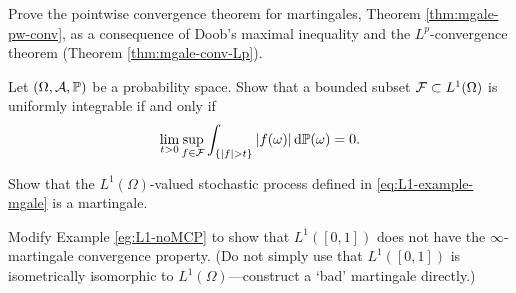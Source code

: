 \begin{exercise}\label{ex:mgale-conv}
  Prove the pointwise convergence theorem for martingales, Theorem \ref{thm:mgale-pw-conv}, as a consequence of Doob's maximal inequality and the $L^p$-convergence theorem (Theorem \ref{thm:mgale-conv-Lp}).
\end{exercise}

\begin{exercise}\label{ex:UI-characterisation}
  Let $(\Omega,\mathcal{A},\mathbb{P})$ be a probability space.
  Show that a bounded subset $\mathcal{F} \subset L^1(\Omega)$ is uniformly integrable if and only if
  \begin{equation*}
    \lim_{t > 0} \sup_{f \in \mathcal{F}} \int_{\{|f| > t\}} |f(\omega)| \, \mathrm{d}\mathbb{P}(\omega) = 0.
  \end{equation*}
\end{exercise}

\begin{exercise}\label{ex:mgale-check}
  Show that the $L^1(\Omega)$-valued stochastic process defined in \eqref{eq:L1-example-mgale} is a martingale. 
\end{exercise}

\begin{exercise}\label{ex:L1-noMCP-var}
  Modify Example \ref{eg:L1-noMCP} to show that $L^1([0,1])$ does not have the $\infty$-martingale convergence property. (Do not simply use that $L^1([0,1])$ is isometrically isomorphic to $L^1(\Omega)$---construct a `bad' martingale directly.)
\end{exercise}




